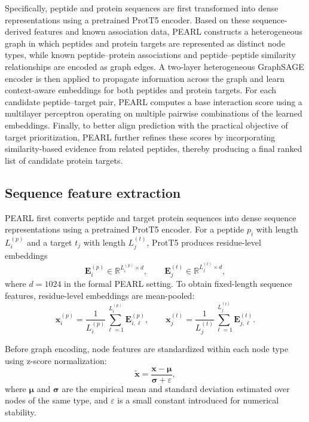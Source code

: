 Specifically, peptide and protein sequences are first transformed into dense representations using a pretrained ProtT5 encoder. Based on these sequence-derived features and known association data, PEARL constructs a heterogeneous graph in which peptides and protein targets are represented as distinct node types, while known peptide--protein associations and peptide--peptide similarity relationships are encoded as graph edges. A two-layer heterogeneous GraphSAGE encoder is then applied to propagate information across the graph and learn context-aware embeddings for both peptides and protein targets. For each candidate peptide--target pair, PEARL computes a base interaction score using a multilayer perceptron operating on multiple pairwise combinations of the learned embeddings. Finally, to better align prediction with the practical objective of target prioritization, PEARL further refines these scores by incorporating similarity-based evidence from related peptides, thereby producing a final ranked list of candidate protein targets.

\subsection{Sequence feature extraction}

PEARL first converts peptide and target protein sequences into dense sequence representations using a pretrained ProtT5 encoder. For a peptide $p_i$ with length $L_i^{(p)}$ and a target $t_j$ with length $L_j^{(t)}$, ProtT5 produces residue-level embeddings
\begin{equation}
\mathbf{E}_i^{(p)} \in \mathbb{R}^{L_i^{(p)} \times d},
\qquad
\mathbf{E}_j^{(t)} \in \mathbb{R}^{L_j^{(t)} \times d},
\end{equation}
where $d = 1024$ in the formal PEARL setting. To obtain fixed-length sequence features, residue-level embeddings are mean-pooled:
\begin{equation}
\mathbf{x}_i^{(p)} = \frac{1}{L_i^{(p)}} \sum_{\ell=1}^{L_i^{(p)}} \mathbf{E}_{i,\ell}^{(p)},
\qquad
\mathbf{x}_j^{(t)} = \frac{1}{L_j^{(t)}} \sum_{\ell=1}^{L_j^{(t)}} \mathbf{E}_{j,\ell}^{(t)}.
\end{equation}

Before graph encoding, node features are standardized within each node type using z-score normalization:
\begin{equation}
\tilde{\mathbf{x}} = \frac{\mathbf{x} - \boldsymbol{\mu}}{\boldsymbol{\sigma} + \varepsilon},
\end{equation}
where $\boldsymbol{\mu}$ and $\boldsymbol{\sigma}$ are the empirical mean and standard deviation estimated over nodes of the same type, and $\varepsilon$ is a small constant introduced for numerical stability.

